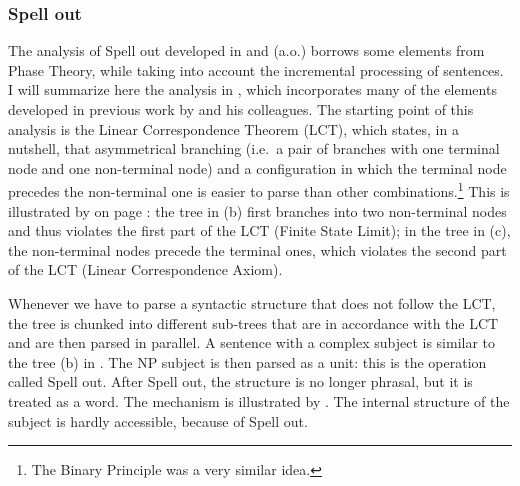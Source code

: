 \subsubsection{Spell out}

The analysis of Spell out developed in \citet{Nunes.2000} and \citet{Uriagereka.2012} (a.o.) borrows some elements from Phase Theory, while taking into account the incremental processing of sentences. I will summarize here the analysis in \citet{Uriagereka.2012}, which incorporates many of the elements developed in previous work by \citeauthor{Uriagereka.2012} and his colleagues. The starting point of this analysis is the Linear Correspondence Theorem (LCT), which states, in a nutshell, that asymmetrical branching (i.e.\ a pair of branches with one terminal node and one non-terminal node) \citep[53]{Uriagereka.2012} and a configuration in which the terminal node precedes the non-terminal one \citep[56]{Uriagereka.2012} is easier to parse than other combinations.\footnote{The Binary Principle \citep{Culicover.1977} was a very similar idea.}
This is illustrated by  on page \pageref{fig:LCT}: the tree in (b) first branches into two non-terminal nodes and thus violates the first part of the LCT (Finite State Limit); in the tree in (c), the non-terminal nodes precede the terminal ones, which violates the second part of the LCT (Linear Correspondence Axiom). 

Whenever we have to parse a syntactic structure that does not follow the LCT, the tree is chunked into different sub-trees that are in accordance with the LCT and are then parsed in parallel. A sentence with a complex subject is similar to the tree (b) in . The NP subject is then parsed as a unit: this is the operation called Spell out. After Spell out, the structure is no longer phrasal, but it is treated as a word. The mechanism is illustrated by . The internal structure of the subject is hardly accessible, because of Spell out.

